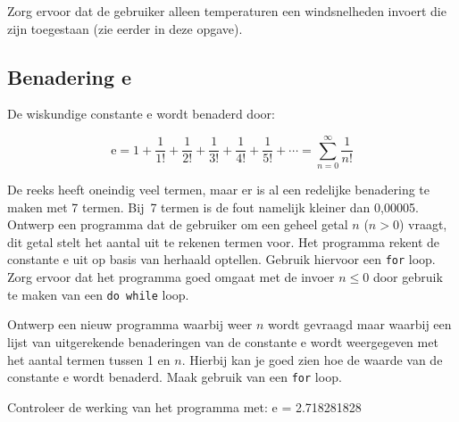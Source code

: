 \documentclass[a4paper,10pt,fleqn,twoside]{article}
\begin{document}
Zorg ervoor dat de gebruiker alleen temperaturen een windsnelheden invoert die zijn toegestaan (zie eerder in deze opgave).

\subsection{Benadering e}
De wiskundige constante e wordt benaderd door:

\begin{equation*}
\mathrm{e} = 1 + \dfrac{1}{1!} + \dfrac{1}{2!} + \dfrac{1}{3!} + \dfrac{1}{4!} + \dfrac{1}{5!} + \cdots = \sum_{n=0}^{\infty} \dfrac{1}{n!}
\end{equation*}

De reeks heeft oneindig veel termen, maar er is al een redelijke benadering te maken met 7 termen. Bij~7 termen is de fout namelijk kleiner dan 0,00005. Ontwerp een programma dat de gebruiker om een geheel getal $n$ ($n > 0$) vraagt, dit getal stelt het aantal uit te rekenen termen voor. Het programma rekent de constante e uit op basis van herhaald optellen. Gebruik hiervoor een \lstinline|for| loop. Zorg ervoor dat het programma goed omgaat met de invoer $n \leq 0$ door gebruik te maken van een \lstinline|do while| loop.

Ontwerp een nieuw programma waarbij weer $n$ wordt gevraagd maar waarbij een lijst van uitgerekende benaderingen van de constante e wordt weergegeven met het aantal termen tussen 1 en $n$. Hierbij kan je goed zien hoe de waarde van de constante e wordt benaderd. Maak gebruik van een \lstinline|for| loop.

Controleer de werking van het programma met: e = 2.718281828

\end{document}
